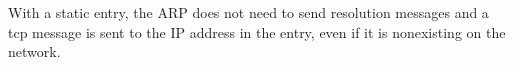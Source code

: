 With a static entry, the ARP does not need to send resolution messages and a tcp message is sent to the IP address in the entry, even if it is nonexisting on the network.\\
